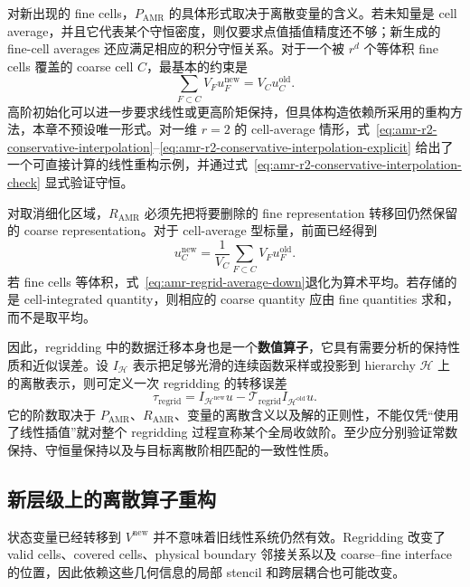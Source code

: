 对新出现的 fine cells，$P_{\mathrm{AMR}}$ 的具体形式取决于离散变量的含义。若未知量是 cell average，并且它代表某个守恒密度，则仅要求点值插值精度还不够；新生成的 fine-cell averages 还应满足相应的积分守恒关系。对于一个被 $r^d$ 个等体积 fine cells 覆盖的 coarse cell $C$，最基本的约束是
\begin{equation}
\boxed{
\sum_{F\subset C}V_F u_F^{\mathrm{new}}
=
V_Cu_C^{\mathrm{old}}.
}
\label{eq:amr-regrid-conservative-refine}
\end{equation}
高阶初始化可以进一步要求线性或更高阶矩保持，但具体构造依赖所采用的重构方法，本章不预设唯一形式。对一维 $r=2$ 的 cell-average 情形，式~\eqref{eq:amr-r2-conservative-interpolation}--\eqref{eq:amr-r2-conservative-interpolation-explicit} 给出了一个可直接计算的线性重构示例，并通过式~\eqref{eq:amr-r2-conservative-interpolation-check} 显式验证守恒。

对取消细化区域，$R_{\mathrm{AMR}}$ 必须先把将要删除的 fine representation 转移回仍然保留的 coarse representation。对于 cell-average 型标量，前面已经得到
\begin{equation}
\boxed{
u_C^{\mathrm{new}}
=
\frac{1}{V_C}
\sum_{F\subset C}V_Fu_F^{\mathrm{old}}.
}
\label{eq:amr-regrid-average-down}
\end{equation}
若 fine cells 等体积，式~\eqref{eq:amr-regrid-average-down}退化为算术平均。若存储的是 cell-integrated quantity，则相应的 coarse quantity 应由 fine quantities 求和，而不是取平均。

因此，regridding 中的数据迁移本身也是一个\textbf{数值算子}，它具有需要分析的保持性质和近似误差。设 $I_{\mathcal H}$ 表示把足够光滑的连续函数采样或投影到 hierarchy $\mathcal H$ 上的离散表示，则可定义一次 regridding 的转移误差
\begin{equation}
\tau_{\mathrm{regrid}}
=
I_{\mathcal H^{\mathrm{new}}}u
-
\mathcal T_{\mathrm{regrid}}
I_{\mathcal H^{\mathrm{old}}}u.
\label{eq:amr-regrid-transfer-error}
\end{equation}
它的阶数取决于 $P_{\mathrm{AMR}}$、$R_{\mathrm{AMR}}$、变量的离散含义以及解的正则性，不能仅凭“使用了线性插值”就对整个 regridding 过程宣称某个全局收敛阶。至少应分别验证常数保持、守恒量保持以及与目标离散阶相匹配的一致性性质。

\subsection{新层级上的离散算子重构}

状态变量已经转移到 $V^{\mathrm{new}}$ 并不意味着旧线性系统仍然有效。Regridding 改变了 valid cells、covered cells、physical boundary 邻接关系以及 coarse--fine interface 的位置，因此依赖这些几何信息的局部 stencil 和跨层耦合也可能改变。

